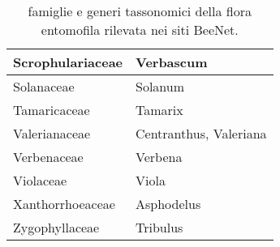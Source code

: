 \documentclass[main.tex]{subfiles}
\begin{document}
\begin{table}[!ht]
\begin{tabular}[\footnotesize]{|p{3cm}|p{9cm}|}
        Scrophulariaceae & Verbascum \\ \hline
        Solanaceae & Solanum \\ \hline
        Tamaricaceae & Tamarix \\ \hline
        Valerianaceae & Centranthus, Valeriana \\ \hline
        Verbenaceae & Verbena \\ \hline
        Violaceae & Viola \\ \hline
        Xanthorrhoeaceae & Asphodelus \\ \hline
        Zygophyllaceae & Tribulus \\ \hline
    \end{tabular}
        \caption{famiglie e generi tassonomici della flora entomofila rilevata nei siti BeeNet.}
    \label{tab:13}
\end{table}
\end{document}
